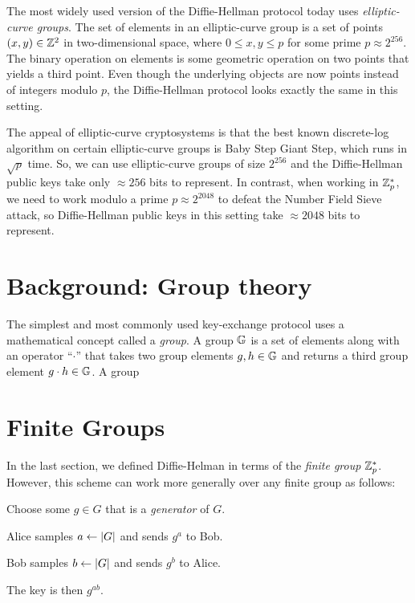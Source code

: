 The most widely used version of the Diffie-Hellman protocol today
uses \emph{elliptic-curve groups}.
The set of elements in an elliptic-curve group is a set of points $(x,y) \in \mathbb{Z}^2$
in two-dimensional space, 
where $0 \leq x, y \leq p$ for some prime $p \approx 2^{256}$.
The binary operation on elements is some geometric operation
on two points that yields a third point.
Even though the underlying objects are now points instead of integers
modulo $p$, the Diffie-Hellman protocol looks exactly the same in this setting.

The appeal of elliptic-curve cryptosystems is that the best known discrete-log
algorithm on certain elliptic-curve groups is Baby Step Giant Step, which runs
in $\sqrt p$ time.
So, we can use elliptic-curve groups of size $2^{256}$ and the Diffie-Hellman
public keys take only $\approx 256$ bits to represent.
In contrast, when working in $\mathbb{Z}^*_p$, we need to work modulo a prime $p \approx 2^{2048}$
to defeat the Number Field Sieve attack, so Diffie-Hellman public keys in
this setting take $\approx 2048$ bits to represent.



\iffalse
\section{Background: Group theory}
The simplest and most commonly used key-exchange protocol uses
a mathematical concept called a \emph{group}.
A group $\mathbb{G}$ is a set of elements along with an operator
``$\cdot$'' that takes two group elements $g, h \in \mathbb{G}$
and returns a third group element $g \cdot h \in \mathbb{G}$.
A group 


\section{Finite Groups}
In the last section, we defined Diffie-Helman in terms of the \emph{finite group} $\mathbb{Z}_p^*$. However, this scheme can work more generally over any finite group as follows:

\begin{compactenum}
	\item Choose some $g \in G$ that is a \emph{generator} of $G$.
	\item Alice samples $a \gets \left| G \right|$ and sends $g^a$ to Bob.
	\item Bob samples $b \gets \left| G \right|$ and sends $g^b$ to Alice.
	\item The key is then $g^{ab}$.
\end{compactenum}

